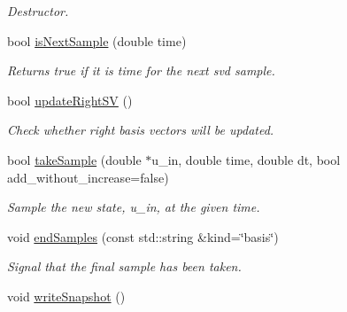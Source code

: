 \begin{DoxyCompactItemize}
\begin{DoxyCompactList}\small\item\em Destructor. \end{DoxyCompactList}\item 
bool \hyperlink{class_c_a_r_o_m_1_1_basis_generator_a4d717cbc01cb35746b87027532dbc7fb}{is\-Next\-Sample} (double time)
\begin{DoxyCompactList}\small\item\em Returns true if it is time for the next svd sample. \end{DoxyCompactList}\item 
bool \hyperlink{class_c_a_r_o_m_1_1_basis_generator_a38812e86b4ae3dbe274906987abdddd2}{update\-Right\-S\-V} ()
\begin{DoxyCompactList}\small\item\em Check whether right basis vectors will be updated. \end{DoxyCompactList}\item 
bool \hyperlink{class_c_a_r_o_m_1_1_basis_generator_a07cf39647b203f99f22b6bf7e0cedb67}{take\-Sample} (double $\ast$u\-\_\-in, double time, double dt, bool add\-\_\-without\-\_\-increase=false)
\begin{DoxyCompactList}\small\item\em Sample the new state, u\-\_\-in, at the given time. \end{DoxyCompactList}\item 
void \hyperlink{class_c_a_r_o_m_1_1_basis_generator_a87092ad38163c566e1e1341f59f78d74}{end\-Samples} (const std\-::string \&kind=\char`\"{}basis\char`\"{})
\begin{DoxyCompactList}\small\item\em Signal that the final sample has been taken. \end{DoxyCompactList}\item 
\hypertarget{class_c_a_r_o_m_1_1_basis_generator_a11091780421f1ca5f781ec006c6ae608}{void \hyperlink{class_c_a_r_o_m_1_1_basis_generator_a11091780421f1ca5f781ec006c6ae608}{write\-Snapshot} ()}\label{class_c_a_r_o_m_1_1_basis_generator_a11091780421f1ca5f781ec006c6ae608}


\end{DoxyCompactItemize}
